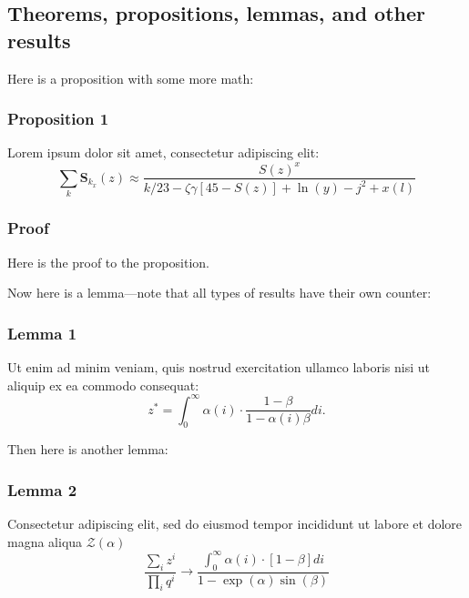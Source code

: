 \documentclass{article}
\begin{document}
\subsection{Theorems, propositions, lemmas, and other results}

Here is a proposition with some more math:   
\subsubsection*{Proposition 1}

Lorem ipsum dolor sit amet, consectetur adipiscing elit:
\setcounter{paperref}{1}\label{e:type1}\[

\sum_k\boldsymbol{S}_{k_x}(z) \approx \frac{S(z)^x}{k / 23 -\zeta\gamma [45- S(z)] + \ln(y) - j^2+x(l)}
\tag{2}
\]
 \wcTpLoremIpsum*[type=sentence,words-per-sentence=33,seed=125]{} 
\setcounter{paperref}{0}\label{p:type1}
\subsubsection*{Proof}
 
Here is the proof to the proposition. \wcTpLoremIpsum*[type=sentence,words-per-sentence=51,seed=126]{} 
 

 \wcTpLoremIpsum*[type=sentence,words-per-sentence=30,seed=127]{}  Now here is a lemma---note that all types of results have their own counter:
\subsubsection*{Lemma 1}
 
Ut enim ad minim veniam, quis nostrud exercitation ullamco laboris nisi ut aliquip ex ea commodo consequat:
\setcounter{paperref}{2}\label{e:cv}\[

z^* = \int_{0}^{\infty} \alpha(i) \cdot \frac{1-\beta}{1-\alpha(i)\beta} di.
\tag{3}
\]
\setcounter{paperref}{0}\label{p:cv}

 \wcTpLoremIpsum*[type=sentence,words-per-sentence=23,seed=128]{}  Then here is another lemma:
\subsubsection*{Lemma 2}

Consectetur adipiscing elit, sed do eiusmod tempor incididunt ut labore et dolore magna aliqua $\mathcal{Z}(\alpha)$ 
\[

\frac{\sum_i z^i}{\prod_i q^i} \to \frac{\int_{0}^{\infty} \alpha(i) \cdot [1-\beta] di}{1-\exp(\alpha)\sin(\beta)}

\]
 \wcTpLoremIpsum*[type=sentence,words-per-sentence=16,seed=129]{}  
\end{document}

